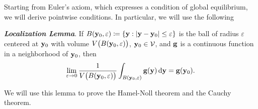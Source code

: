 Starting from Euler's axiom, which expresses a condition of global equilibrium, we will derive pointwise conditions. In particular, we will use the following 

\begin{definition}
	\textit{\textbf{Localization Lemma}}. If $B(\mathbf{y}_0, \varepsilon) \coloneqq \{\mathbf{y} : |\mathbf{y} - \mathbf{y}_0| \leq \varepsilon \}$ is the ball of radius $\varepsilon$ centered at $\mathbf{y}_0$ with volume $V\big(B(\mathbf{y}_0, \varepsilon)\big)$, $\mathbf{y}_0 \in \mathcal{V}$, and $\mathbf{g}$ is a continuous function in a neighborhood of $\mathbf{y}_0$, then
\begin{equation}\label{lemma3}
	\lim_{\varepsilon \to 0}\frac{1}{V\big(B(\mathbf{y}_0, \varepsilon)\big)}\int_{B(\mathbf{y}_0, \varepsilon)} \mathbf{g} (\mathbf{y}) \, \mathrm{d} \mathbf{y} = \mathbf{g}(\mathbf{y}_0).
\end{equation}
\end{definition}

We will use this lemma to prove the Hamel-Noll theorem and the Cauchy theorem.

